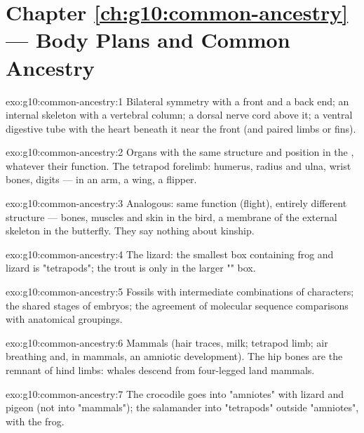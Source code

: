 \section*{Chapter \ref{ch:g10:common-ancestry} --- Body Plans and Common Ancestry}

\begin{solution}{exo:g10:common-ancestry:1}
Bilateral symmetry with a front and a back end; an internal skeleton
with a vertebral column; a dorsal nerve cord above it; a ventral
digestive tube with the heart beneath it near the front (and paired
limbs or fins).
\end{solution}

\begin{solution}{exo:g10:common-ancestry:2}
Organs with the same structure and position in the , whatever
their function. The tetrapod forelimb: humerus, radius and ulna, wrist
bones, digits --- in an arm, a wing, a flipper.
\end{solution}

\begin{solution}{exo:g10:common-ancestry:3}
Analogous: same function (flight), entirely different structure ---
bones, muscles and skin in the bird, a membrane of the external
skeleton in the butterfly. They say nothing about kinship.
\end{solution}

\begin{solution}{exo:g10:common-ancestry:4}
The lizard: the smallest box containing frog and lizard is "tetrapods";
the trout is only in the larger "" box.
\end{solution}

\begin{solution}{exo:g10:common-ancestry:5}
Fossils with intermediate combinations of characters; the shared
stages of  embryos; the agreement of molecular sequence
comparisons with anatomical groupings.
\end{solution}

\begin{solution}{exo:g10:common-ancestry:6}
Mammals (hair traces, milk; tetrapod limb; air breathing and, in
mammals, an amniotic development). The hip bones are the remnant of
hind limbs: whales descend from four-legged land mammals.
\end{solution}

\begin{solution}{exo:g10:common-ancestry:7}
The crocodile goes into "amniotes" with lizard and pigeon (not into
"mammals"); the salamander into "tetrapods" outside "amniotes", with
the frog.
\end{solution}

